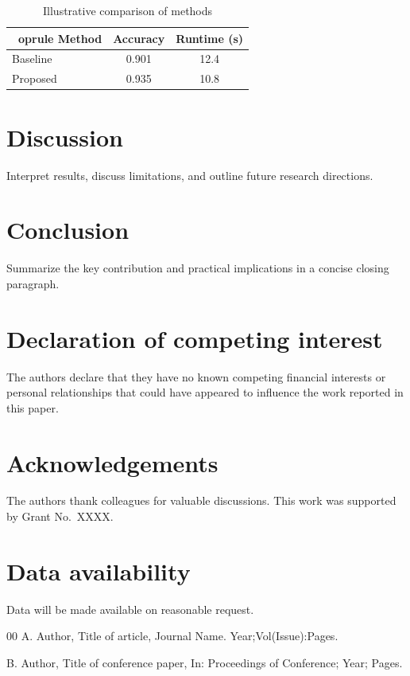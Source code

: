 \documentclass[preprint,12pt]{elsarticle}
\begin{document}
\begin{table}[htbp]
\caption{Illustrative comparison of methods}
\label{tab:results}
\begin{tabular}{lcc}
\	oprule
Method & Accuracy & Runtime (s) \\
\midrule
Baseline & 0.901 & 12.4 \\
Proposed & 0.935 & 10.8 \\
\bottomrule
\end{tabular}
\end{table}

\section{Discussion}
Interpret results, discuss limitations, and outline future research directions.

\section{Conclusion}
Summarize the key contribution and practical implications in a concise closing paragraph.

\section*{Declaration of competing interest}
The authors declare that they have no known competing financial interests or personal relationships that could have appeared to influence the work reported in this paper.

\section*{Acknowledgements}
The authors thank colleagues for valuable discussions. This work was supported by Grant No.~XXXX.

\section*{Data availability}
Data will be made available on reasonable request.


\begin{thebibliography}{00}
A. Author, Title of article, Journal Name. Year;Vol(Issue):Pages.

B. Author, Title of conference paper, In: Proceedings of Conference; Year; Pages.
\end{thebibliography}
\end{document}
